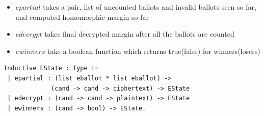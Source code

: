 \documentclass{llncs}
\begin{document}
\begin{itemize}
 \item $epartial$ takes a pair, list of uncounted ballots and invalid ballots seen 
       so far, and computed homomorphic margin so far
 \item $edecrypt$ takes final decrypted margin after all the ballots are counted
 \item $ewinners$ take a boolean function which returns true(false) for winners(losers)
\end{itemize}


\begin{verbatim}
Inductive EState : Type :=
 | epartial : (list eballot * list eballot) ->
             (cand -> cand -> ciphertext) -> EState
 | edecrypt : (cand -> cand -> plaintext) -> EState
 | ewinners : (cand -> bool) -> EState.
\end{verbatim}
\end{document}
